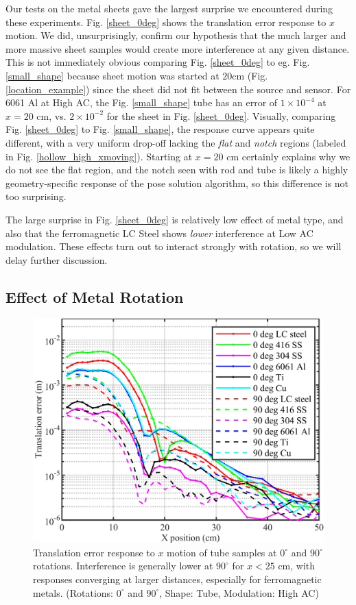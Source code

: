 \documentclass[journal,twoside,web]{ieeecolor}
\begin{document}
Our tests on the metal sheets gave the largest surprise we encountered during these experiments. Fig. \ref{sheet_0deg} shows the translation error response to $x$ motion. We did, unsurprisingly, confirm our hypothesis that the much larger and more massive sheet samples would create more interference at any given distance. This is not immediately obvious comparing Fig. \ref{sheet_0deg} to eg. Fig. \ref{small_shape} because sheet motion was started at $20$cm (Fig. \ref{location_example}) since the sheet did not fit between the source and sensor. For 6061 Al at High AC, the Fig. \ref{small_shape} tube has an error of $1\times 10^{-4}$ at $x=20$ cm, vs. $2\times 10^{-2}$ for the sheet in Fig. \ref{sheet_0deg}. Visually, comparing Fig. \ref{sheet_0deg} to Fig. \ref{small_shape}, the response curve appears quite different, with a very uniform drop-off lacking the \textit{flat} and \textit{notch} regions (labeled in Fig. \ref{hollow_high_xmoving}). Starting at $x=20$ cm certainly explains why we do not see the flat region, and the notch seen with rod and tube is likely a highly geometry-specific response of the pose solution algorithm, so this difference is not too surprising. 

The large surprise in Fig. \ref{sheet_0deg} is relatively low effect of metal type, and also that the ferromagnetic LC Steel shows \textit{lower} interference at Low AC modulation. These effects turn out to interact strongly with rotation, so we will delay further discussion.

\subsection{Effect of Metal Rotation}
\begin{figure}[H]
\centerline{\includegraphics[width=\columnwidth]{chaic14.png}}
\caption{Translation error response to $x$ motion of tube samples at $0^\circ$ and $90^\circ$ rotations. Interference is generally lower at $90^\circ$ for $x < 25$ cm, with responses converging at larger distances, especially for ferromagnetic metals.
(Rotations: $0^\circ$ and $90^\circ$, Shape: Tube, Modulation: High AC)}
\label{90deg_high_tube}
\end{figure}
\end{document}
